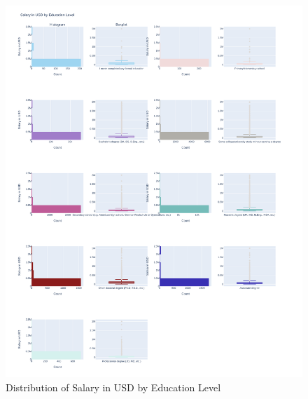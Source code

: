 \documentclass{article}
\begin{document}
\begin{figure}[ht]
    \centering
    \includegraphics[width=\textwidth]{images/salary_EdLevel_hist.pdf}
    \caption{Distribution of Salary in USD by Education Level}
    \label{fig:salarybyedlevelhist}
\end{figure}
\end{document}
